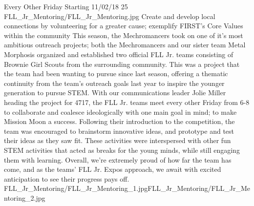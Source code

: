 {Every Other Friday Starting 11/02/18}
{25}
{FLL_Jr_Mentoring/FLL_Jr_Mentoring.jpg}
{Create and develop local connections by volunteering for a greater cause; exemplify FIRST's Core Values within the community} 
{
This season, the Mechromancers took on one of it's most ambitious outreach projects; both the Mechromancers and our sister team Metal Morphosis organized and established two official FLL Jr. teams consisting of Brownie Girl Scouts from the surrounding community. This was a project that the team had been wanting to pursue since last season, offering a thematic continuity from the team's outreach goals last year to inspire the younger generation to pursue STEM. With our communications leader Jolie Miller heading the project for 4717, the FLL Jr. teams meet every other Friday from 6-8 to collaborate and coalesce ideologically with one main goal in mind; to make Mission Moon a success. Following their introduction to the competition, the team was encouraged to brainstorm innovative ideas, and prototype and test their ideas as they saw fit. These activities were interspersed with other fun STEM activities that acted as breaks for the young minds, while still engaging them with learning. Overall, we're extremely proud of how far the team has come, and as the teams' FLL Jr. Expos approach, we await with excited anticipation to see their progress pays off.
} 
{FLL_Jr_Mentoring/FLL_Jr_Mentoring_1.jpg}{FLL_Jr_Mentoring/FLL_Jr_Mentoring_2.jpg}
